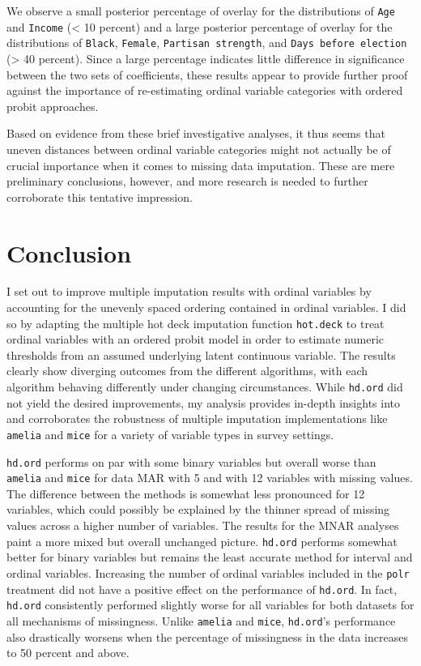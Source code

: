 \documentclass[12pt,econ]{sources/authesis}
\begin{document}
We observe a small posterior percentage of overlay for the distributions of \texttt{Age} and \texttt{Income} (\textless{} 10 percent) and a large posterior percentage of overlay for the distributions of \texttt{Black}, \texttt{Female}, \texttt{Partisan\ strength}, and \texttt{Days\ before\ election} (\textgreater{} 40 percent). Since a large percentage indicates little difference in significance between the two sets of coefficients, these results appear to provide further proof against the importance of re-estimating ordinal variable categories with ordered probit approaches.

Based on evidence from these brief investigative analyses, it thus seems that uneven distances between ordinal variable categories might not actually be of crucial importance when it comes to missing data imputation. These are mere preliminary conclusions, however, and more research is needed to further corroborate this tentative impression.

\hypertarget{ordmiss-conclusion}{%
\section{Conclusion}\label{ordmiss-conclusion}}

I set out to improve multiple imputation results with ordinal variables by accounting for the unevenly spaced ordering contained in ordinal variables. I did so by adapting the multiple hot deck imputation function \texttt{hot.deck} to treat ordinal variables with an ordered probit model in order to estimate numeric thresholds from an assumed underlying latent continuous variable. The results clearly show diverging outcomes from the different algorithms, with each algorithm behaving differently under changing circumstances. While \texttt{hd.ord} did not yield the desired improvements, my analysis provides in-depth insights into and corroborates the robustness of multiple imputation implementations like \texttt{amelia} and \texttt{mice} for a variety of variable types in survey settings.

\texttt{hd.ord} performs on par with some binary variables but overall worse than \texttt{amelia} and \texttt{mice} for data MAR with 5 and with 12 variables with missing values. The difference between the methods is somewhat less pronounced for 12 variables, which could possibly be explained by the thinner spread of missing values across a higher number of variables. The results for the MNAR analyses paint a more mixed but overall unchanged picture. \texttt{hd.ord} performs somewhat better for binary variables but remains the least accurate method for interval and ordinal variables. Increasing the number of ordinal variables included in the \texttt{polr} treatment did not have a positive effect on the performance of \texttt{hd.ord}. In fact, \texttt{hd.ord} consistently performed slightly worse for all variables for both datasets for all mechanisms of missingness. Unlike \texttt{amelia} and \texttt{mice}, \texttt{hd.ord}'s performance also drastically worsens when the percentage of missingness in the data increases to 50 percent and above.
\end{document}
